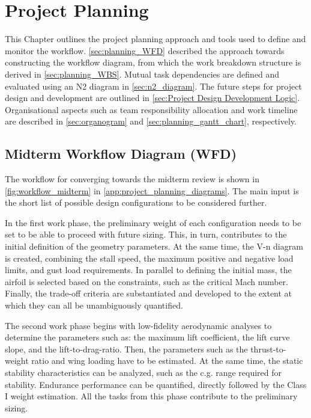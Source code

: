 \chapter{Project Planning}
\label{ch:planning}

This Chapter outlines the project planning approach and tools used to define and monitor the workflow. \autoref{sec:planning_WFD} described the approach towards constructing the workflow diagram, from which the work breakdown structure is derived in \autoref{sec:planning_WBS}. Mutual task dependencies are defined and evaluated using an N2 diagram in \autoref{sec:n2_diagram}. The future steps for project design and development are outlined in \autoref{sec:Project Design Development Logic}. Organisational aspects such as team responsibility allocation and work timeline are described in \autoref{sec:organogram} and \autoref{sec:planning_gantt_chart}, respectively.
\section{Midterm Workflow Diagram (WFD)}
\label{sec:planning_WFD}

The workflow for converging towards the midterm review is shown in \autoref{fig:workflow_midterm} in \autoref{app:project_planning_diagrams}. The main input is the short list of possible design configurations to be considered further. 

In the first work phase, the preliminary weight of each configuration needs to be set to be able to proceed with future sizing. This, in turn, contributes to the initial definition of the geometry parameters. At the same time, the V-n diagram is created, combining the stall speed, the maximum positive and negative load limits, and gust load requirements. In parallel to defining the initial mass, the airfoil is selected based on the constraints, such as the critical Mach number. Finally, the trade-off criteria are substantiated and developed to the extent at which they can all be unambiguously quantified.

The second work phase begins with low-fidelity aerodynamic analyses to determine the parameters such as: the maximum lift coefficient, the lift curve slope, and the lift-to-drag-ratio. Then, the parameters such as the thrust-to-weight ratio and wing loading have to be estimated. At the same time, the static stability characteristics can be analyzed, such as the c.g. range required for stability. Endurance performance can be quantified, directly followed by the Class I weight estimation. %
All the tasks from this phase contribute to the preliminary sizing.

